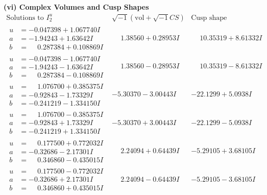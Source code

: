 \documentclass[1p]{elsarticle_modified}
\theoremstyle{definition}
\newcommand{\I}{\sqrt{-1}}
\begin{document}
\newpage\flushleft \textbf{(vi) Complex Volumes and Cusp Shapes}
$$\begin{array}{c|c|c}  
\text{Solutions to }I^u_{2}& \I (\text{vol} + \sqrt{-1}CS) & \text{Cusp shape}\\
 \hline 
\begin{aligned}
u &= -0.047398 + 1.067740 I \\
a &= -1.94243 + 1.63642 I \\
b &= \phantom{-}0.287384 + 0.108869 I\end{aligned}
 & \phantom{-}1.38560 + 0.28953 I & \phantom{-}10.35319 + 8.61332 I \\ \hline\begin{aligned}
u &= -0.047398 - 1.067740 I \\
a &= -1.94243 - 1.63642 I \\
b &= \phantom{-}0.287384 - 0.108869 I\end{aligned}
 & \phantom{-}1.38560 - 0.28953 I & \phantom{-}10.35319 - 8.61332 I \\ \hline\begin{aligned}
u &= \phantom{-}1.076700 + 0.385375 I \\
a &= -0.92843 - 1.73329 I \\
b &= -0.241219 - 1.334150 I\end{aligned}
 & -5.30370 - 3.00443 I & -22.1299 + 5.0938 I \\ \hline\begin{aligned}
u &= \phantom{-}1.076700 - 0.385375 I \\
a &= -0.92843 + 1.73329 I \\
b &= -0.241219 + 1.334150 I\end{aligned}
 & -5.30370 + 3.00443 I & -22.1299 - 5.0938 I \\ \hline\begin{aligned}
u &= \phantom{-}0.177500 + 0.772032 I \\
a &= -0.32686 - 2.17301 I \\
b &= \phantom{-}0.346860 - 0.435015 I\end{aligned}
 & \phantom{-}2.24094 + 0.64439 I & -5.29105 + 3.68105 I \\ \hline\begin{aligned}
u &= \phantom{-}0.177500 - 0.772032 I \\
a &= -0.32686 + 2.17301 I \\
b &= \phantom{-}0.346860 + 0.435015 I\end{aligned}
 & \phantom{-}2.24094 - 0.64439 I & -5.29105 - 3.68105 I \\ \hline\begin{aligned}

\end{aligned}
\end{array}$$
\end{document}
